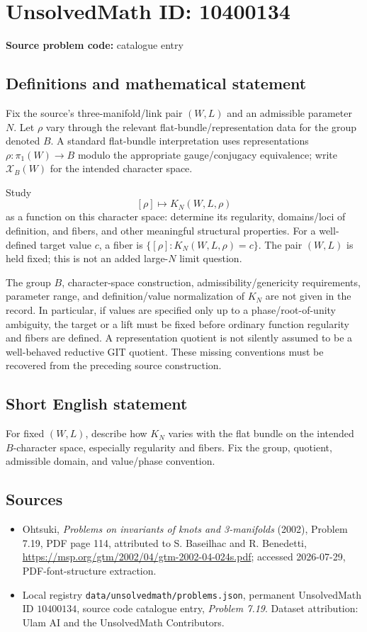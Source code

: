 \documentclass[11pt]{article}
\begin{document}
\section*{UnsolvedMath ID: 10400134}
\textbf{Source problem code:} catalogue entry
\subsection{Definitions and mathematical statement}
Fix the source's three-manifold/link pair $(W,L)$ and an admissible parameter $N$. Let $\rho$ vary through the relevant flat-bundle/representation data for the group denoted $B$. A standard flat-bundle interpretation uses representations $\rho:\pi_1(W)\to B$ modulo the appropriate gauge/conjugacy equivalence; write $\mathcal X_B(W)$ for the intended character space.

Study
\[
[\rho]\longmapsto K_N(W,L,\rho)
\]
as a function on this character space: determine its regularity, domains/loci of definition, and fibers, and other meaningful structural properties. For a well-defined target value $c$, a fiber is $\{[\rho]:K_N(W,L,\rho)=c\}$. The pair $(W,L)$ is held fixed; this is not an added large-$N$ limit question.

The group $B$, character-space construction, admissibility/genericity requirements, parameter range, and definition/value normalization of $K_N$ are not given in the record. In particular, if values are specified only up to a phase/root-of-unity ambiguity, the target or a lift must be fixed before ordinary function regularity and fibers are defined. A representation quotient is not silently assumed to be a well-behaved reductive GIT quotient. These missing conventions must be recovered from the preceding source construction.
\subsection{Short English statement}
For fixed $(W,L)$, describe how $K_N$ varies with the flat bundle on the intended $B$-character space, especially regularity and fibers. Fix the group, quotient, admissible domain, and value/phase convention.
\subsection{Sources}
\begin{itemize}
\item Ohtsuki, \emph{Problems on invariants of knots and 3-manifolds} (2002), Problem 7.19, PDF page 114, attributed to S. Baseilhac and R. Benedetti, \url{https://msp.org/gtm/2002/04/gtm-2002-04-024s.pdf}; accessed 2026-07-29, PDF-font-structure extraction.
\item Local registry \texttt{data/unsolvedmath/problems.json}, permanent UnsolvedMath ID $10400134$, source code catalogue entry, \emph{Problem 7.19}. Dataset attribution: Ulam AI and the UnsolvedMath Contributors.
\end{itemize}
\end{document}
